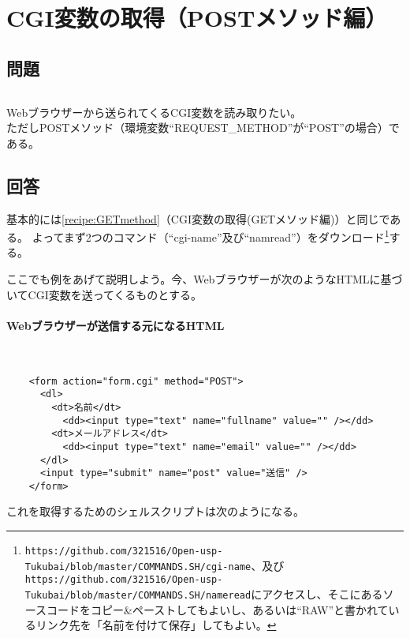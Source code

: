 \section{CGI変数の取得（POSTメソッド編）}
\label{recipe:POSTmethod}

\subsection*{問題}
\noindent
$\!\!\!\!\!$
\begin{grshfboxit}{160.0mm}
	Webブラウザーから送られてくるCGI変数を読み取りたい。\\
	ただしPOSTメソッド（環境変数``REQUEST\_{}METHOD''が``POST''の場合）である。
\end{grshfboxit}

\subsection*{回答}
基本的には\ref{recipe:GETmethod}（CGI変数の取得(GETメソッド編)）と同じである。
よってまず2つのコマンド（``cgi-name''及び``namread''）をダウンロード\footnote{\verb|https://github.com/321516/Open-usp-Tukubai/blob/master/COMMANDS.SH/cgi-name|、及び \\ \verb|https://github.com/321516/Open-usp-Tukubai/blob/master/COMMANDS.SH/nameread|にアクセスし、そこにあるソースコードをコピー\&{}ペーストしてもよいし、あるいは``RAW''と書かれているリンク先を「名前を付けて保存」してもよい。}する。

ここでも例をあげて説明しよう。今、Webブラウザーが次のようなHTMLに基づいてCGI変数を送ってくるものとする。
\paragraph{Webブラウザーが送信する元になるHTML} 　\\
\begin{frameboxit}{160.0mm}
\begin{verbatim}
	<form action="form.cgi" method="POST">
	  <dl>
	    <dt>名前</dt>
	      <dd><input type="text" name="fullname" value="" /></dd>
	    <dt>メールアドレス</dt>
	      <dd><input type="text" name="email" value="" /></dd>
	  </dl>
	  <input type="submit" name="post" value="送信" />
	</form>
\end{verbatim}
\end{frameboxit}

これを取得するためのシェルスクリプトは次のようになる。
